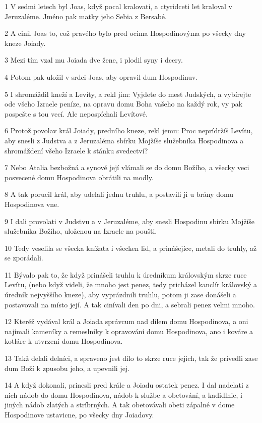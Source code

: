 \par 1 V sedmi letech byl Joas, když pocal kralovati, a ctyridceti let kraloval v Jeruzaléme. Jméno pak matky jeho Sebia z Bersabé.
\par 2 A cinil Joas to, což pravého bylo pred ocima Hospodinovýma po všecky dny kneze Joiady.
\par 3 Mezi tím vzal mu Joiada dve žene, i plodil syny i dcery.
\par 4 Potom pak uložil v srdci Joas, aby opravil dum Hospodinuv.
\par 5 I shromáždil kneží a Levíty, a rekl jim: Vyjdete do mest Judských, a vybírejte ode všeho Izraele peníze, na opravu domu Boha vašeho na každý rok, vy pak pospešte s tou vecí. Ale nepospíchali Levítové.
\par 6 Protož povolav král Joiady, predního kneze, rekl jemu: Proc neprídržíš Levítu, aby snesli z Judstva a z Jeruzaléma sbírku Mojžíše služebníka Hospodinova a shromáždení všeho Izraele k stánku svedectví?
\par 7 Nebo Atalia bezbožná a synové její vlámali se do domu Božího, a všecky veci posvecené domu Hospodinova obrátili na modly.
\par 8 A tak porucil král, aby udelali jednu truhlu, a postavili ji u brány domu Hospodinova vne.
\par 9 I dali provolati v Judstvu a v Jeruzaléme, aby snesli Hospodinu sbírku Mojžíše služebníka Božího, uloženou na Izraele na poušti.
\par 10 Tedy veselila se všecka knížata i všecken lid, a prinášejíce, metali do truhly, až se zporádali.
\par 11 Bývalo pak to, že když prinášeli truhlu k úredníkum královským skrze ruce Levítu, (nebo když videli, že mnoho jest penez, tedy pricházel kanclír královský a úredník nejvyššího kneze), aby vyprázdnili truhlu, potom ji zase donášeli a postavovali na místo její. A tak cinívali den po dni, a sebrali penez velmi mnoho.
\par 12 Kteréž vydával král a Joiada správcum nad dílem domu Hospodinova, a oni najímali kameníky a remeslníky k opravování domu Hospodinova, ano i kováre a kotláre k utvrzení domu Hospodinova.
\par 13 Takž delali delníci, a spraveno jest dílo to skrze ruce jejich, tak že privedli zase dum Boží k zpusobu jeho, a upevnili jej.
\par 14 A když dokonali, prinesli pred krále a Joiadu ostatek penez. I dal nadelati z nich nádob do domu Hospodinova, nádob k službe a obetování, a kadidlnic, i jiných nádob zlatých a stríbrných. A tak obetovávali obeti zápalné v dome Hospodinove ustavicne, po všecky dny Joiadovy.
